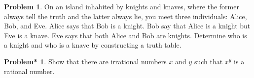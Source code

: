 \documentclass[12pt,english]{amsart}
\theoremstyle{plain}
\theoremstyle{definition}
\theoremstyle{plain}
\theoremstyle{plain}
\theoremstyle{remark}
\newcounter{problems}
\theoremstyle{definition}
\newtheorem{problem}[problems]{Problem}
\newtheorem{bproblem}[problems]{ Problem*}
\theoremstyle{remark}
\newtheorem*{solution}{Solution}
\begin{document}
\begin{problem}
	On an island inhabited by knights and knaves, where the former always tell the truth and the latter always lie, you meet three individuals: Alice, Bob, and Eve. Alice says that Bob is a knight. Bob say that Alice is a knight but Eve is a knave. Eve says that both Alice and Bob are knights. Determine who is a knight and who is a knave by constructing a truth table.
\end{problem}

	


	 


\begin{bproblem}
Show that there are irrational numbers $x$ and $y$ 
such that 
$x^y$ is a rational number. 
\end{bproblem}


%	
\end{document}
